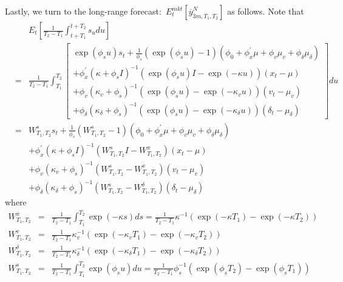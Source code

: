 \documentclass{article}
\begin{document}
Lastly, we turn to the long-range forecast:\ $E_{t}^{mkt}\left[ \overline{y}%
_{3m,T_{1},T_{2}}^{N}\right] $ as follows. Note that%
\begin{eqnarray*}
&&E_{t}\left[ \frac{1}{T_{2}-T_{1}}\int_{t+T_{1}}^{t+T_{2}}s_{u}du\right] \\
&=&\frac{1}{T_{2}-T_{1}}\int_{T_{1}}^{T_{2}}\left[ 
\begin{array}{c}
\exp \left( \phi _{s}u\right) s_{t}+\frac{1}{\phi _{s}}\left( \exp \left(
\phi _{s}u\right) -1\right) \left( \phi _{0}+\phi _{x}^{\prime }\mu +\phi
_{v}\mu _{v}+\phi _{\delta }\mu _{\delta }\right) \\ 
+\phi _{x}^{\prime }\left( \kappa +\phi _{s}I\right) ^{-1}\left( \exp \left(
\phi _{s}u\right) I-\exp \left( -\kappa u\right) \right) \left( x_{t}-\mu
\right) \\ 
+\phi _{v}\left( \kappa _{v}+\phi _{s}\right) ^{-1}\left( \exp \left( \phi
_{s}u\right) -\exp \left( -\kappa _{v}u\right) \right) \left( v_{t}-\mu
_{v}\right) \\ 
+\phi _{\delta }\left( \kappa _{\delta }+\phi _{s}\right) ^{-1}\left( \exp
\left( \phi _{s}u\right) -\exp \left( -\kappa _{\delta }u\right) \right)
\left( \delta _{t}-\mu _{\delta }\right)%
\end{array}%
\right] du \\
&=&W_{T_{1},T_{2}}^{s}s_{t}+\frac{1}{\phi _{s}}\left(
W_{T_{1},T_{2}}^{s}-1\right) \left( \phi _{0}+\phi _{x}^{\prime }\mu +\phi
_{v}\mu _{v}+\phi _{\delta }\mu _{\delta }\right) \\
&&+\phi _{x}^{\prime }\left( \kappa +\phi _{s}I\right) ^{-1}\left(
W_{T_{1},T_{2}}^{s}I-W_{T_{1},T_{2}}^{x}\right) \left( x_{t}-\mu \right) \\
&&+\phi _{v}\left( \kappa _{v}+\phi _{s}\right) ^{-1}\left(
W_{T_{1},T_{2}}^{s}-W_{T_{1},T_{2}}^{v}\right) \left( v_{t}-\mu _{v}\right)
\\
&&+\phi _{\delta }\left( \kappa _{\delta }+\phi _{s}\right) ^{-1}\left(
W_{T_{1},T_{2}}^{s}-W_{T_{1},T_{2}}^{\delta }\right) \left( \delta _{t}-\mu
_{\delta }\right)
\end{eqnarray*}%
where%
\begin{eqnarray*}
W_{T_{1},T_{2}}^{x} &=&\frac{1}{T_{2}-T_{1}}\int_{T_{1}}^{T_{2}}\exp \left(
-\kappa s\right) ds=\frac{1}{T_{2}-T_{1}}\kappa ^{-1}\left( \exp \left(
-\kappa T_{1}\right) -\exp \left( -\kappa T_{2}\right) \right) \\
W_{T_{1},T_{2}}^{v} &=&\frac{1}{T_{2}-T_{1}}\kappa _{v}^{-1}\left( \exp
\left( -\kappa _{v}T_{1}\right) -\exp \left( -\kappa _{v}T_{2}\right) \right)
\\
W_{T_{1},T_{2}}^{\delta } &=&\frac{1}{T_{2}-T_{1}}\kappa _{\delta
}^{-1}\left( \exp \left( -\kappa _{\delta }T_{1}\right) -\exp \left( -\kappa
_{\delta }T_{2}\right) \right) \\
W_{T_{1},T_{2}}^{s} &=&\frac{1}{T_{2}-T_{1}}\int_{T_{1}}^{T_{2}}\exp \left(
\phi _{s}u\right) du=\frac{1}{T_{2}-T_{1}}\phi _{s}^{-1}\left( \exp \left(
\phi _{s}T_{2}\right) -\exp \left( \phi _{s}T_{1}\right) \right)
\end{eqnarray*}
\end{document}
